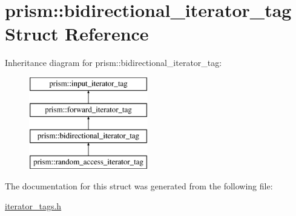 \hypertarget{structprism_1_1bidirectional__iterator__tag}{}\section{prism\+:\+:bidirectional\+\_\+iterator\+\_\+tag Struct Reference}
\label{structprism_1_1bidirectional__iterator__tag}
Inheritance diagram for prism\+:\+:bidirectional\+\_\+iterator\+\_\+tag\+:\begin{figure}[H]
\begin{center}
\leavevmode
\includegraphics[height=4.000000cm]{structprism_1_1bidirectional__iterator__tag}
\end{center}
\end{figure}


The documentation for this struct was generated from the following file\+:\begin{DoxyCompactItemize}
\item 
\hyperlink{iterator__tags_8h}{iterator\+\_\+tags.\+h}\end{DoxyCompactItemize}
